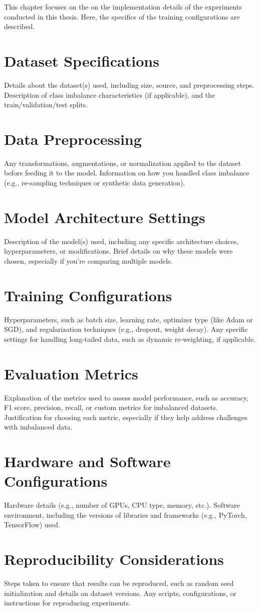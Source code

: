 
This chapter focuses on the on the implementation details of the experiments conducted in this thesis. Here, the specifics of the training configurations are described. 

\section{Dataset Specifications}
Details about the dataset(s) used, including size, source, and preprocessing steps.
Description of class imbalance characteristics (if applicable), and the train/validation/test splits.

\section{Data Preprocessing}
Any transformations, augmentations, or normalization applied to the dataset before feeding it to the model.
Information on how you handled class imbalance (e.g., re-sampling techniques or synthetic data generation).

\section{Model Architecture Settings}
Description of the model(s) used, including any specific architecture choices, hyperparameters, or modifications.
Brief details on why these models were chosen, especially if you’re comparing multiple models.

\section{Training Configurations}
Hyperparameters, such as batch size, learning rate, optimizer type (like Adam or SGD), and regularization techniques (e.g., dropout, weight decay).
Any specific settings for handling long-tailed data, such as dynamic re-weighting, if applicable.

\section{Evaluation Metrics}
Explanation of the metrics used to assess model performance, such as accuracy, F1 score, precision, recall, or custom metrics for imbalanced datasets.
Justification for choosing each metric, especially if they help address challenges with imbalanced data.

\section{Hardware and Software Configurations}
Hardware details (e.g., number of GPUs, CPU type, memory, etc.).
Software environment, including the versions of libraries and frameworks (e.g., PyTorch, TensorFlow) used.

\section{Reproducibility Considerations}
Steps taken to ensure that results can be reproduced, such as random seed initialization and details on dataset versions.
Any scripts, configurations, or instructions for reproducing experiments.
